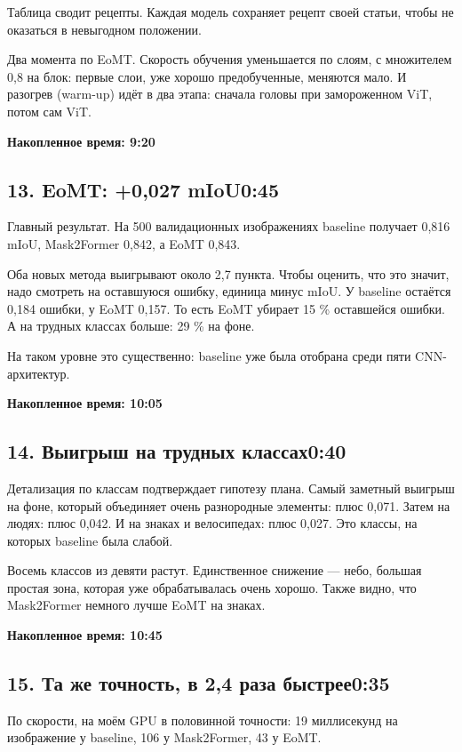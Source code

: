 \documentclass[11pt,a4paper]{article}
\newcommand{\cumul}[1]{\par{\hfill\small\color{accent}\bfseries #1}\par}
\newcommand{\tempo}[1]{\hfill{\normalsize\color{accent}#1}}
\begin{document}
Таблица сводит рецепты. Каждая модель сохраняет рецепт своей статьи, чтобы не оказаться в невыгодном положении.

Два момента по EoMT. Скорость обучения уменьшается по слоям, с множителем 0,8 на блок: первые слои, уже хорошо предобученные, меняются мало. И разогрев (warm-up) идёт в два этапа: сначала головы при замороженном ViT, потом сам ViT.

\cumul{Накопленное время: 9:20}

\subsection*{13. EoMT: +0,027 mIoU\tempo{0:45}}

Главный результат. На 500 валидационных изображениях baseline получает 0,816 mIoU, Mask2Former 0,842, а EoMT 0,843.

Оба новых метода выигрывают около 2,7 пункта. Чтобы оценить, что это значит, надо смотреть на оставшуюся ошибку, единица минус mIoU. У baseline остаётся 0,184 ошибки, у EoMT 0,157. То есть EoMT убирает 15 \% оставшейся ошибки. А на трудных классах больше: 29 \% на фоне.

На таком уровне это существенно: baseline уже была отобрана среди пяти CNN-архитектур.

\cumul{Накопленное время: 10:05}

\subsection*{14. Выигрыш на трудных классах\tempo{0:40}}

Детализация по классам подтверждает гипотезу плана. Самый заметный выигрыш на фоне, который объединяет очень разнородные элементы: плюс 0,071. Затем на людях: плюс 0,042. И на знаках и велосипедах: плюс 0,027. Это классы, на которых baseline была слабой.

Восемь классов из девяти растут. Единственное снижение — небо, большая простая зона, которая уже обрабатывалась очень хорошо. Также видно, что Mask2Former немного лучше EoMT на знаках.

\cumul{Накопленное время: 10:45}

\subsection*{15. Та же точность, в 2,4 раза быстрее\tempo{0:35}}

По скорости, на моём GPU в половинной точности: 19 миллисекунд на изображение у baseline, 106 у Mask2Former, 43 у EoMT.
\end{document}

